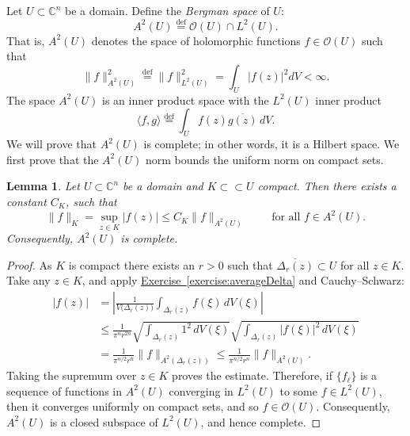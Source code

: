 \documentclass[12pt,openany]{book}
\newcommand{\linnprod}[2]{\langle #1 , #2 \rangle}
\newcommand{\sabs}[1]{\lvert {#1} \rvert}
\newcommand{\snorm}[1]{\lVert {#1} \rVert}
\newcommand{\abs}[1]{\left\lvert {#1} \right\rvert}
\newcommand{\C}{{\mathbb{C}}}
\newcommand{\sO}{{\mathscr{O}}}
\newcommand{\myindex}[1]{#1\index{#1}}
\theoremstyle{plain}
\newtheorem{lemma}[thm]{Lemma}
\theoremstyle{remark}
\theoremstyle{definition}
\theoremstyle{exercise}
\theoremstyle{example}
\newcommand{\exerciseref}[1]{\hyperref[#1]{Exercise~\ref*{#1}}}
\begin{document}
Let $U \subset \C^n$ be a domain.  Define the
\emph{\myindex{Bergman space}} of $U$:
%
%
\begin{equation*}
A^2(U) \overset{\text{def}}{=} \sO(U) \cap L^2(U) .
\end{equation*}
That is, $A^2(U)$ denotes the space
of holomorphic functions $f \in \sO(U)$ such that
%
\begin{equation*}
\snorm{f}_{A^2(U)}^2 \overset{\text{def}}{=} \snorm{f}_{L^2(U)}^2
= \int_U \sabs{f(z)}^2 dV < \infty .
\end{equation*}
The space $A^2(U)$ is
an inner product space with the
$L^2(U)$ inner product
%
\begin{equation*}
\linnprod{f}{g} \overset{\text{def}}{=} \int_U f(z) \overline{g(z)} \, dV .
\end{equation*}
We will prove that $A^2(U)$ is
complete; in other words, it is a Hilbert space.  We first
prove that
the $A^2(U)$ norm bounds the
uniform norm on compact sets.

\begin{lemma} \label{lemma:bergmanKbound}
Let $U \subset \C^n$ be a domain and $K \subset \subset U$ compact.  Then
there exists a constant $C_K$, such that
\begin{equation*}
\snorm{f}_K
=
\sup_{z \in K} \sabs{f(z)}
\leq C_K \snorm{f}_{A^2(U)}
\qquad \text{ for all } f\in A^2(U) .
\end{equation*}
Consequently, $A^2(U)$ is complete.
\end{lemma}

\begin{proof}
As $K$ is compact there exists an $r > 0$ such that
$\overline{\Delta_r(z)} \subset U$
for all $z \in K$.
Take any $z \in K$, and
apply \exerciseref{exercise:averageDelta} and Cauchy--Schwarz:
\begin{equation*}
\begin{split}
\abs{f(z)} &=
\abs{\frac{1}{V\bigl(\Delta_r(z)\bigr)} \int_{\Delta_r(z)} f(\xi) \,
dV(\xi)}
\\
& \leq
\frac{1}{\pi^n r^{2n}}
\sqrt{\int_{\Delta_r(z)} 1^2 \, dV(\xi)}
\sqrt{\int_{\Delta_r(z)} \abs{f(\xi)}^2 \, dV(\xi)}
\\
& =
\frac{1}{\pi^{n/2} r^n}
\snorm{f}_{A^2(\Delta_r(z))}
\leq
\frac{1}{\pi^{n/2} r^n}
\snorm{f}_{A^2(U)} .
\end{split}
\end{equation*}
Taking the supremum over $z \in K$ proves the estimate.
Therefore, if $\{ f_\ell \}$ is a sequence of functions in $A^2(U)$
converging in $L^2(U)$ to some $f \in
L^2(U)$, then it converges uniformly on compact sets, and so $f \in \sO(U)$.
Consequently, $A^2(U)$ is a closed subspace of $L^2(U)$, and hence complete.
\end{proof}
\end{document}

